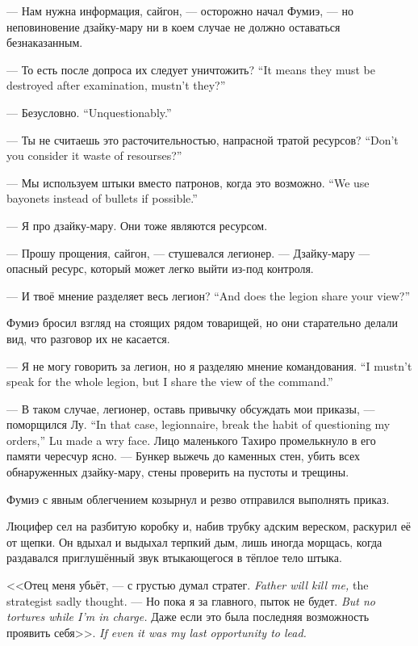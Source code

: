 --- Нам нужна информация, сайгон, --- осторожно начал Фумиэ, --- но неповиновение дзайку-мару ни в коем случае не должно оставаться безнаказанным.

{--- То есть после допроса их следует уничтожить?}
{``It means they must be destroyed after examination, mustn't they?''}

{--- Безусловно.}
{``Unquestionably.''}

{--- Ты не считаешь это расточительностью, напрасной тратой ресурсов?}
{``Don't you consider it waste of resourses?''}

{--- Мы используем штыки вместо патронов, когда это возможно.}
{``We use bayonets instead of bullets if possible.''}

--- Я про дзайку-мару.
Они тоже являются ресурсом.

--- Прошу прощения, сайгон, --- стушевался легионер.
--- Дзайку-мару --- опасный ресурс, который может легко выйти из-под контроля.

{--- И твоё мнение разделяет весь легион?}
{``And does the legion share your view?''}

Фумиэ бросил взгляд на стоящих рядом товарищей, но они старательно делали вид, что разговор их не касается.

{--- Я не могу говорить за легион, но я разделяю мнение командования.}
{``I mustn't speak for the whole legion, but I share the view of the command.''}

{--- В таком случае, легионер, оставь привычку обсуждать мои приказы, --- поморщился Лу.}
{``In that case, legionnaire, break the habit of questioning my orders,'' Lu made a wry face.}
Лицо маленького Тахиро промелькнуло в его памяти чересчур ясно.
--- Бункер выжечь до каменных стен, убить всех обнаруженных дзайку-мару, стены проверить на пустоты и трещины.

Фумиэ с явным облегчением козырнул и резво отправился выполнять приказ.

Люцифер сел на разбитую коробку и, набив трубку адским вереском, раскурил её от щепки.
Он вдыхал и выдыхал терпкий дым, лишь иногда морщась, когда раздавался приглушённый звук втыкающегося в тёплое тело штыка.

{<<Отец меня убьёт, --- с грустью думал стратег.}
{\textit{Father will kill me,} the strategist sadly thought.}
{--- Но пока я за главного, пыток не будет.}
{\textit{But no tortures while I'm in charge.}}
{Даже если это была последняя возможность проявить себя>>.}
{\textit{If even it was my last opportunity to lead.}}

